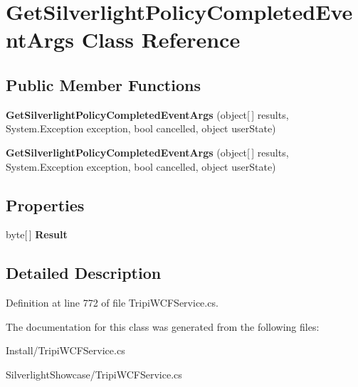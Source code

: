 \hypertarget{class_get_silverlight_policy_completed_event_args}{
\section{GetSilverlightPolicyCompletedEventArgs Class Reference}
\label{class_get_silverlight_policy_completed_event_args}
}
\subsection*{Public Member Functions}
\begin{DoxyCompactItemize}
\item 
\hypertarget{class_get_silverlight_policy_completed_event_args_a26f3e708745a92344fc8d4fbf1da2560}{
{\bfseries GetSilverlightPolicyCompletedEventArgs} (object\mbox{[}$\,$\mbox{]} results, System.Exception exception, bool cancelled, object userState)}
\label{class_get_silverlight_policy_completed_event_args_a26f3e708745a92344fc8d4fbf1da2560}

\item 
\hypertarget{class_get_silverlight_policy_completed_event_args_a26f3e708745a92344fc8d4fbf1da2560}{
{\bfseries GetSilverlightPolicyCompletedEventArgs} (object\mbox{[}$\,$\mbox{]} results, System.Exception exception, bool cancelled, object userState)}
\label{class_get_silverlight_policy_completed_event_args_a26f3e708745a92344fc8d4fbf1da2560}

\end{DoxyCompactItemize}
\subsection*{Properties}
\begin{DoxyCompactItemize}
\item 
\hypertarget{class_get_silverlight_policy_completed_event_args_a04b31105ac3420dfaa7b6d6c614badd3}{
byte\mbox{[}$\,$\mbox{]} {\bfseries Result}}
\label{class_get_silverlight_policy_completed_event_args_a04b31105ac3420dfaa7b6d6c614badd3}

\end{DoxyCompactItemize}


\subsection{Detailed Description}


Definition at line 772 of file TripiWCFService.cs.

The documentation for this class was generated from the following files:\begin{DoxyCompactItemize}
\item 
Install/TripiWCFService.cs\item 
SilverlightShowcase/TripiWCFService.cs\end{DoxyCompactItemize}
